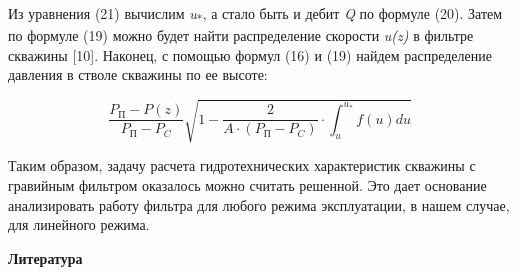 \begin{multicols}{2}
Из уравнения (21) вычислим \emph{u}\textsubscript{*}, а стало быть и
дебит \emph{Q} по формуле (20). Затем по формуле (19) можно будет найти
распределение скорости \emph{u(z)} в фильтре скважины {[}10{]}. Наконец,
с помощью формул (16) и (19) найдем распределение давления в стволе
скважины по ее высоте:

\begin{equation}
\frac{P_{\text{П}}-P(z)}{P_{\text{П}}-P_C}\sqrt{1-\frac{2}{A\cdot(P_{\text{П}}-P_C)}\cdot\int_u^{u_*}f(u)du}
\end{equation}

Таким образом, задачу расчета гидротехнических характеристик скважины с
гравийным фильтром оказалось можно считать решенной. Это дает основание
анализировать работу фильтра для любого режима эксплуатации, в нашем
случае, для линейного режима.
\end{multicols}

\begin{center}
{\bfseries Литература}
\end{center}

